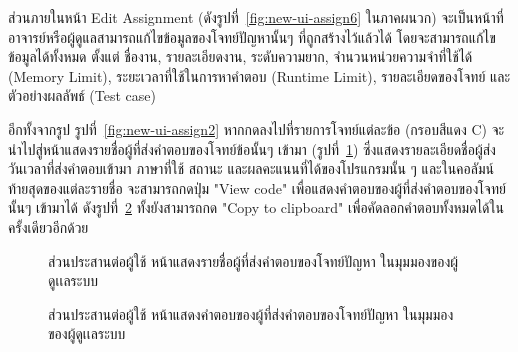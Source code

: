 \documentclass[12pt,one side,openright,a4paper]{cpe-thesis-th}
\newcommand{\thaijustify}[1]{%
  \par\hspace{30pt}\justifying
  #1
}
\begin{document}
                \thaijustify{
                    ส่วนภายในหน้า Edit Assignment (ดังรูปที่~\ref{fig:new-ui-assign6} ในภาคผนวก) จะเป็นหน้าที่อาจารย์หรือผู้ดูแลสามารถแก้ไขข้อมูลของโจทย์ปัญหานั้นๆ ที่ถูกสร้างไว้แล้วได้ โดยจะสามารถแก้ไขข้อมูลได้ทั้งหมด ตั้งแต่ ชื่องาน, รายละเอียดงาน, ระดับความยาก, จำนวนหน่วยความจำที่ใช้ได้ (Memory Limit), ระยะเวลาที่ใช้ในการหาคำตอบ (Runtime Limit), รายละเอียดของโจทย์ และตัวอย่างผลลัพธ์ (Test case)
                }
                \thaijustify{
                    อีกทั้งจากรูป รูปที่~\ref{fig:new-ui-assign2} หากกดลงไปที่รายการโจทย์แต่ละข้อ (กรอบสีแดง C) จะนำไปสู่หน้าแสดงรายชื่อผู้ที่ส่งคำตอบของโจทย์ข้อนั้นๆ เข้ามา (รูปที่~\ref{fig:new-ui-assign3}) ซึ่งแสดงรายละเอียดชื่อผู้ส่ง วันเวลาที่ส่งคำตอบเข้ามา ภาษาที่ใช้ สถานะ และผลคะแนนที่ได้ของโปรแกรมนั้น ๆ และในคอลัมน์ท้ายสุดของแต่ละรายชื่อ จะสามารถกดปุ่ม "View code" เพื่อแสดงคำตอบของผู้ที่ส่งคำตอบของโจทย์นั้นๆ เข้ามาได้ ดังรูปที่~\ref{fig:new-ui-assign4} ทั้งยังสามารถกด "Copy to clipboard" เพื่อคัดลอกคำตอบทั้งหมดได้ในครั้งเดียวอีกด้วย
                }
                \begin{figure}[H]
                    \centering
                    \caption[ส่วนประสานต่อผู้ใช้ หน้าแสดงรายชื่อผู้ที่ส่งคำตอบของโจทย์ปัญหา]{ส่วนประสานต่อผู้ใช้ หน้าแสดงรายชื่อผู้ที่ส่งคำตอบของโจทย์ปัญหา ในมุมมองของผู้ดูเเลระบบ}
                    \label{fig:new-ui-assign3}
                \end{figure}
                \begin{figure}[H]
                        \centering
                    \caption[ส่วนประสานต่อผู้ใช้ หน้าแสดงคำตอบของผู้ที่ส่งคำตอบของโจทย์ปัญหา]{ส่วนประสานต่อผู้ใช้ หน้าแสดงคำตอบของผู้ที่ส่งคำตอบของโจทย์ปัญหา ในมุมมองของผู้ดูเเลระบบ}
                    \label{fig:new-ui-assign4}
                \end{figure}
\end{document}
